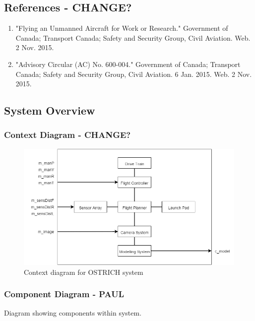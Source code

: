 \documentclass[10pt,letterpaper]{article}
\begin{document}
\newpage


\subsection{References - CHANGE?}
\begin{enumerate}
	\item "Flying an Unmanned Aircraft for Work or Research." Government of Canada; Transport Canada; Safety and Security Group, Civil Aviation. Web. 2 Nov. 2015.
	\item "Advisory Circular (AC) No. 600-004." Government of Canada; Transport Canada; Safety and Security Group, Civil Aviation. 6 Jan. 2015. Web. 2 Nov. 2015.
\end{enumerate}


\newpage


\subsection{System Overview}

\subsubsection{Context Diagram - CHANGE?}
\begin{figure}[h]
\centering
\includegraphics[scale=0.5]{Context_Diagram_1.png}
\caption{Context diagram for OSTRICH system}
\label{fig:context_diagram}
\end{figure}

\subsubsection{Component Diagram - PAUL}
Diagram showing components within system.

\newpage
\end{document}

